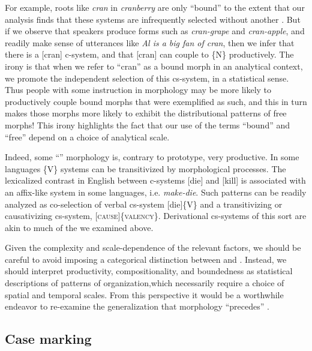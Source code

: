   For example, roots like \textit{cran} in \textit{cranberry} are only “bound” to the extent that our analysis finds that these systems are infrequently selected without another . But if we observe that speakers produce forms such as \textit{cran-grape} and \textit{cran-apple}, and readily make sense of utterances like \textit{Al is a big fan of cran}, then we infer that there is a [cran] c-system, and that [cran] can couple to \{N\} productively. The irony is that when we refer to “cran” as a bound morph in an analytical context, we promote the independent selection of this cs-system, in a statistical sense. Thus people with some instruction in morphology may be more likely to productively couple bound morphs that were exemplified as such, and this in turn makes those morphs more likely to exhibit the distributional patterns of free morphs! This irony highlights the fact that our use of the terms “bound” and “free” depend on a choice of analytical scale.

  Indeed, some “” morphology is, contrary to prototype, very productive. In some languages  \{V\} systems can be transitivized by morphological processes. The lexicalized  contrast in English between c-systems [die] and [kill] is associated with an affix-like system in some languages, i.e. \textit{make-die}. Such patterns can be readily analyzed as co-selection of verbal cs-system [die]\{V\} and a transitivizing or causativizing cs-system, [\textsc{cause}]\{\textsc{va\-len\-cy}\}. Derivational cs-systems of this sort are akin to much of the  we examined above. 

  Given the complexity and scale-dependence of the relevant factors, we should be careful to avoid imposing a categorical distinction between  and . Instead, we should interpret productivity, compositionality, and boundedness as statistical descriptions of patterns of organization,\linebreak which necessarily require a choice of spatial and temporal scales. From this perspective it would be a worthwhile endeavor to re-examine the generalization that  morphology “precedes”  \citep{Booij1996}.

\subsection{Case marking}

